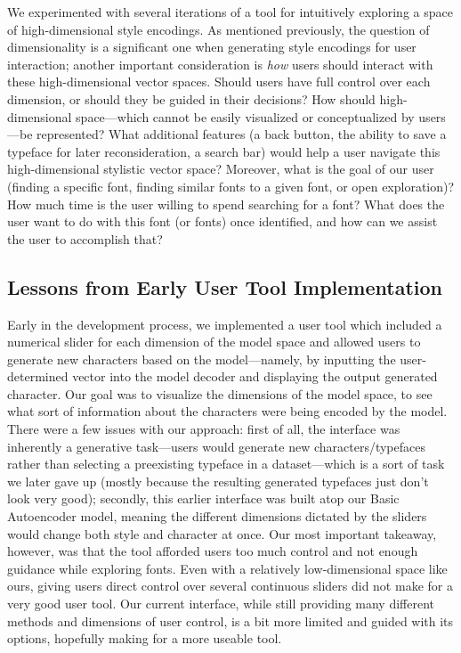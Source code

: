 We experimented with several iterations of a tool for intuitively exploring a space of high-dimensional style encodings. As mentioned previously, the question of dimensionality is a significant one when generating style encodings for user interaction; another important consideration is \textit{how} users should interact with these high-dimensional vector spaces. Should users have full control over each dimension, or should they be guided in their decisions? How should high-dimensional space—which cannot be easily visualized or conceptualized by users—be represented? What additional features (a back button, the ability to save a typeface for later reconsideration, a search bar) would help a user navigate this high-dimensional stylistic vector space? Moreover, what is the goal of our user (finding a specific font, finding similar fonts to a given font, or open exploration)? How much time is the user willing to spend searching for a font? What does the user want to do with this font (or fonts) once identified, and how can we assist the user to accomplish that?

\subsection{Lessons from Early User Tool Implementation}

Early in the development process, we implemented a user tool which included a numerical slider for each dimension of the model space and allowed users to generate new characters based on the model---namely, by inputting the user-determined vector into the model decoder and displaying the output generated character. Our goal was to visualize the dimensions of the model space, to see what sort of information about the characters were being encoded by the model. There were a few issues with our approach: first of all, the interface was inherently a generative task---users would generate new characters/typefaces rather than selecting a preexisting typeface in a dataset---which is a sort of task we later gave up (mostly because the resulting generated typefaces just don't look very good); secondly, this earlier interface was built atop our Basic Autoencoder model, meaning the different dimensions dictated by the sliders would change both style and character at once. Our most important takeaway, however, was that the tool afforded users too much control and not enough guidance while exploring fonts. Even with a relatively low-dimensional space like ours, giving users direct control over several continuous sliders did not make for a very good user tool. Our current interface, while still providing many different methods and dimensions of user control, is a bit more limited and guided with its options, hopefully making for a more useable tool.

